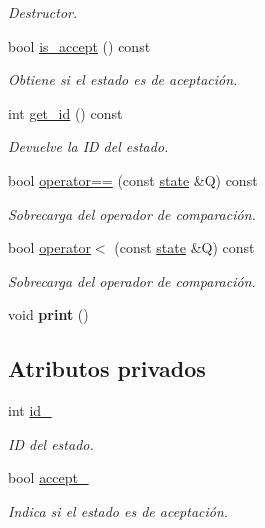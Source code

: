 \begin{DoxyCompactItemize}
\begin{DoxyCompactList}\small\item\em Destructor. \end{DoxyCompactList}\item 
bool \hyperlink{classstate_a49f9a14bacf7ccd3180555a646e6a02f}{is\+\_\+accept} () const 
\begin{DoxyCompactList}\small\item\em Obtiene si el estado es de aceptación. \end{DoxyCompactList}\item 
int \hyperlink{classstate_a6e5e89c3ed6c2e2594bc1a8bf03bdc1e}{get\+\_\+id} () const 
\begin{DoxyCompactList}\small\item\em Devuelve la I\+D del estado. \end{DoxyCompactList}\item 
bool \hyperlink{classstate_ac9e58d75849a619942eedde3576ffefd}{operator==} (const \hyperlink{classstate}{state} \&Q) const 
\begin{DoxyCompactList}\small\item\em Sobrecarga del operador de comparación. \end{DoxyCompactList}\item 
bool \hyperlink{classstate_a23c20be6def430527ec1b98b6751f002}{operator$<$} (const \hyperlink{classstate}{state} \&Q) const 
\begin{DoxyCompactList}\small\item\em Sobrecarga del operador de comparación. \end{DoxyCompactList}\item 
\hypertarget{classstate_a8cd42463fb7015ac1bda015d6d662eb1}{}void {\bfseries print} ()\label{classstate_a8cd42463fb7015ac1bda015d6d662eb1}

\end{DoxyCompactItemize}
\subsection*{Atributos privados}
\begin{DoxyCompactItemize}
\item 
\hypertarget{classstate_a60c5078c3ac59b85ac4b77157fe91d01}{}int \hyperlink{classstate_a60c5078c3ac59b85ac4b77157fe91d01}{id\+\_\+}\label{classstate_a60c5078c3ac59b85ac4b77157fe91d01}

\begin{DoxyCompactList}\small\item\em I\+D del estado. \end{DoxyCompactList}\item 
\hypertarget{classstate_ad16d75b8aaa4a1fed6eb97be5d107d77}{}bool \hyperlink{classstate_ad16d75b8aaa4a1fed6eb97be5d107d77}{accept\+\_\+}\label{classstate_ad16d75b8aaa4a1fed6eb97be5d107d77}

\begin{DoxyCompactList}\small\item\em Indica si el estado es de aceptación. \end{DoxyCompactList}\end{DoxyCompactItemize}


